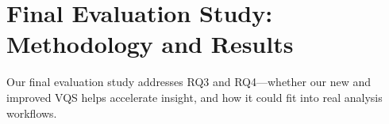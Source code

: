 \section{Final Evaluation Study: Methodology and Results} \label{evaluation}
\par Our final evaluation study addresses RQ3 and RQ4---whether our new and improved VQS helps accelerate insight, and how it could fit into real analysis workflows. 
